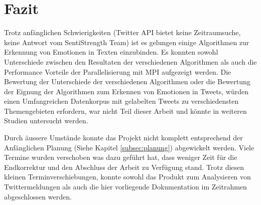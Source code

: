 \clearpage
\section{Fazit}
Trotz anfänglichen Schwierigkeiten (Twitter API bietet keine Zeitraumsuche, keine Antwort vom SentiStrength Team) ist es gelungen einige Algorithmen zur Erkennung von Emotionen in Texten einzubinden. Es konnten sowohl Unterschiede zwischen den Resultaten der verschiedenen Algorithmen als auch die Performance Vorteile der Parallelisierung mit MPI aufgezeigt werden. Die Bewertung der Unterschiede der verschiedenen Algorithmen oder die Bewertung der Eignung der Algorithmen zum Erkennen von Emotionen in Tweets, würden einen Umfangreichen Datenkorpus mit gelabelten Tweets zu verschiedensten Themengebieten erfordern, war nicht Teil dieser Arbeit und könnte in weiteren Studien untersucht werden.

Durch äussere Umstände konnte das Projekt nicht komplett entsprechend der Anfänglichen Planung (Siehe Kapitel \ref{subsec:planung}) abgewickelt werden. Viele Termine wurden verschoben was dazu geführt hat, dass weniger Zeit für die Endkorrektur und den Abschluss der Arbeit zu Verfügung stand. Trotz diesen kleinen Terminverschiebungen, konnte sowohl das Produkt zum Analysieren von Twittermeldungen als auch die hier vorliegende Dokumentation im Zeitrahmen abgeschlossen werden. 